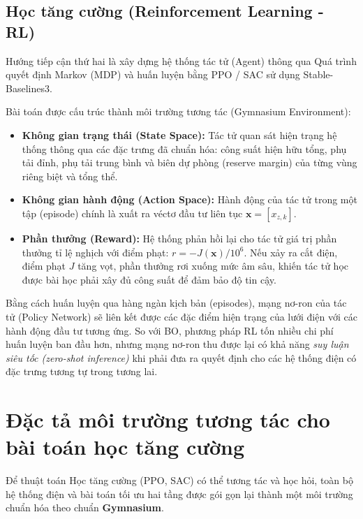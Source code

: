 \subsection{Học tăng cường (Reinforcement Learning - RL)}
Hướng tiếp cận thứ hai là xây dựng hệ thống tác tử (Agent) thông qua Quá trình quyết định Markov (MDP) và huấn luyện bằng PPO / SAC sử dụng Stable-Baselines3.

Bài toán được cấu trúc thành môi trường tương tác (Gymnasium Environment):
\begin{itemize}
    \item \textbf{Không gian trạng thái (State Space):} Tác tử quan sát hiện trạng hệ thống thông qua các đặc trưng đã chuẩn hóa: công suất hiện hữu tổng, phụ tải đỉnh, phụ tải trung bình và biên dự phòng (reserve margin) của từng vùng riêng biệt và tổng thể.
    \item \textbf{Không gian hành động (Action Space):} Hành động của tác tử trong một tập (episode) chính là xuất ra véctơ đầu tư liên tục $\mathbf{x} = [x_{z,k}]$.
    \item \textbf{Phần thưởng (Reward):} Hệ thống phản hồi lại cho tác tử giá trị phần thưởng tỉ lệ nghịch với điểm phạt: $r = -J(\mathbf{x}) / 10^6$. Nếu xảy ra cắt điện, điểm phạt $J$ tăng vọt, phần thưởng rơi xuống mức âm sâu, khiến tác tử học được bài học phải xây đủ công suất để đảm bảo độ tin cậy.
\end{itemize}

Bằng cách huấn luyện qua hàng ngàn kịch bản (episodes), mạng nơ-ron của tác tử (Policy Network) sẽ liên kết được các đặc điểm hiện trạng của lưới điện với các hành động đầu tư tương ứng. So với BO, phương pháp RL tốn nhiều chi phí huấn luyện ban đầu hơn, nhưng mạng nơ-ron thu được lại có khả năng \textit{suy luận siêu tốc (zero-shot inference)} khi phải đưa ra quyết định cho các hệ thống điện có đặc trưng tương tự trong tương lai.



\section{Đặc tả môi trường tương tác cho bài toán học tăng cường}

Để thuật toán Học tăng cường (PPO, SAC) có thể tương tác và học hỏi, toàn bộ hệ thống điện và bài toán tối ưu hai tầng được gói gọn lại thành một môi trường chuẩn hóa theo chuẩn \textbf{Gymnasium}. 

